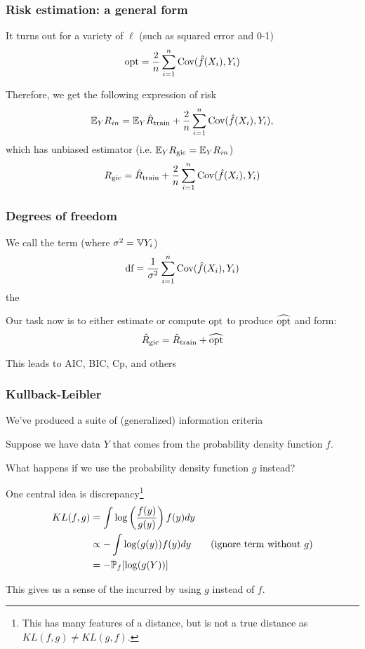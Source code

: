 \documentclass{beamer}
\begin{document}
\begin{frame}
\frametitle{Risk estimation: a general form}
It turns out for a variety of $\ell$ (such as squared error and 0-1)
\[
\opt = \frac{2}{n} \sum_{i=1}^n \textrm{Cov}(\hat f(X_i),Y_i)
\]
\vsp

Therefore, we get the following expression of risk
\[
 \E_Y R_{in} = \E_Y \train + \frac{2}{n} \sum_{i=1}^n \textrm{Cov}(\hat f(X_i),Y_i),
\]
which has unbiased estimator (i.e. $\E_Y \gic =  \E_Y R_{in}$)
\[
\gic = \train + \frac{2}{n} \sum_{i=1}^n \textrm{Cov}(\hat f(X_i),Y_i)
\]
\end{frame}

\begin{frame}
\frametitle{Degrees of freedom}
We call the term (where $\sigma^2 = \V Y_i$)
\[
\df = \frac{1}{\sigma^2} \sum_{i=1}^n \textrm{Cov}(\hat f(X_i),Y_i)
\]
the 


\vsp
Our task now is to either estimate or compute $\opt$ to produce $\opthat$ and form:
\[
\gichat = \train + \opthat
\]

\vsp
This leads to AIC, BIC, Cp, and others

\end{frame}


\begin{frame}
\frametitle{ Kullback-Leibler}

We've produced a suite 
of (generalized) information criteria

\vsp
Suppose we have data $Y$ that comes from the probability density function $f$.

\vsp
What happens if we use the probability density function $g$ instead?

\vsp
One central idea is \Note discrepancy\footnote{This has many features of a distance, but is not a true distance as $KL(f,g) \neq KL(g,f)$.} \begin{align*}
KL(f,g) & = \int \log\left( \frac{f(y)}{g(y)} \right)f(y) dy \\
& \propto
-\int \log (g(y)) f(y) dy \qquad \textrm{(ignore term without $g$)}\\
& = 
-\P_f [\log (g(Y))] 
\end{align*}

This gives us a sense of the  incurred by using $g$ instead of $f$. 
\end{frame}
\end{document}

